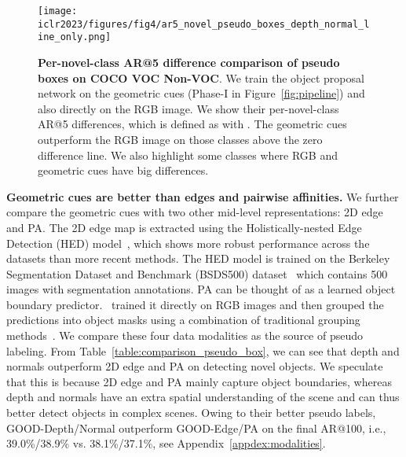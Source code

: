 \documentclass{article} \usepackage{iclr2023_conference,times}
\begin{document}
\begin{figure}[t]
    \centering
\texttt{[image: iclr2023/figures/fig4/ar5\_novel\_pseudo\_boxes\_depth\_normal\_line\_only.png]}
\caption{\textbf{Per-novel-class AR@5 difference comparison of pseudo boxes on COCO VOC  Non-VOC}. We train the object proposal network on the geometric cues (Phase-I in Figure~\ref{fig:pipeline}) and also directly on the RGB image. We show their per-novel-class AR@5 differences, which is defined as  with . The geometric cues outperform the RGB image on those classes above the zero difference line. We also highlight some classes where RGB and geometric cues have big differences.
    }
    \label{fig:depth_classwise}
\end{figure}





\textbf{Geometric cues are better than edges and pairwise affinities.}
We further compare the geometric cues with two other mid-level representations: 2D edge and PA. 
The 2D edge map is extracted using the Holistically-nested Edge Detection (HED) model~\citep{xie2015holistically}, which shows more robust performance across the datasets than more recent methods. The HED model is trained on the Berkeley Segmentation Dataset and Benchmark (BSDS500) dataset~\citep{amfm_pami2011} which contains 500 images with segmentation annotations. PA can be thought of as a learned object boundary predictor.~\citet{wang2022open} trained it directly on RGB images and then grouped the predictions into object masks using a combination of  traditional grouping methods~\citep{shi2000normalized, arbelaez2006UCM, MCG}. 
We compare these four data modalities as the source of pseudo labeling. 
From Table~\ref{table:comparison_pseudo_box}, we can see that depth and normals outperform 2D edge and PA on detecting novel objects. 
We speculate that this is because 2D edge and PA mainly capture object boundaries, whereas depth and normals have an extra spatial understanding of the scene and can thus better detect objects in complex scenes. 
Owing to their better pseudo labels, GOOD-Depth/Normal outperform GOOD-Edge/PA on the final AR@100, i.e., 39.0\%/38.9\% vs. 38.1\%/37.1\%, see Appendix~\ref{appdex:modalities}.
\end{document}
